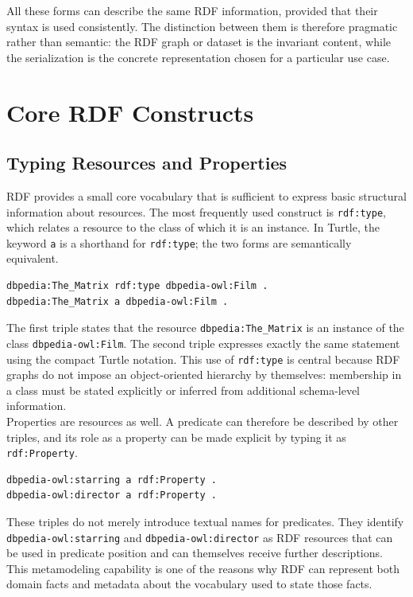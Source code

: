 \documentclass{scrbook}
\begin{document}
	All these forms can describe the same RDF information, provided that their syntax is used consistently. The distinction between them is therefore pragmatic rather than semantic: the RDF graph or dataset is the invariant content, while the serialization is the concrete representation chosen for a particular use case.
	
	\chapter{Core RDF Constructs}
	
	\section{Typing Resources and Properties}
	
	RDF provides a small core vocabulary that is sufficient to express basic structural information about resources. The most frequently used construct is \texttt{rdf:type}, which relates a resource to the class of which it is an instance. In Turtle, the keyword \texttt{a} is a shorthand for \texttt{rdf:type}; the two forms are semantically equivalent.
	
	\begin{lstlisting}
dbpedia:The_Matrix rdf:type dbpedia-owl:Film .
dbpedia:The_Matrix a dbpedia-owl:Film .
	\end{lstlisting}
	
	The first triple states that the resource \texttt{dbpedia:The\_Matrix} is an instance of the class \texttt{dbpedia-owl:Film}. The second triple expresses exactly the same statement using the compact Turtle notation. This use of \texttt{rdf:type} is central because RDF graphs do not impose an object-oriented hierarchy by themselves: membership in a class must be stated explicitly or inferred from additional schema-level information.\\
	
	Properties are resources as well. A predicate can therefore be described by other triples, and its role as a property can be made explicit by typing it as \texttt{rdf:Property}.
	
	\begin{lstlisting}
dbpedia-owl:starring a rdf:Property .
dbpedia-owl:director a rdf:Property .
	\end{lstlisting}
	
	These triples do not merely introduce textual names for predicates. They identify \texttt{dbpedia-owl:starring} and \texttt{dbpedia-owl:director} as RDF resources that can be used in predicate position and can themselves receive further descriptions. This metamodeling capability is one of the reasons why RDF can represent both domain facts and metadata about the vocabulary used to state those facts.
	
\end{document}
